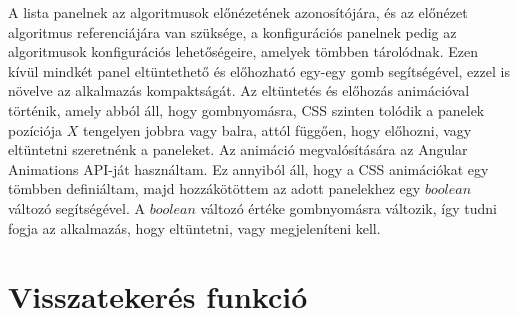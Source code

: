 A lista panelnek az algoritmusok előnézetének azonosítójára, és az előnézet algoritmus referenciájára van szüksége, a konfigurációs panelnek pedig az algoritmusok konfigurációs lehetőségeire, amelyek tömbben tárolódnak. Ezen kívül mindkét panel eltüntethető és előhozható egy-egy gomb segítségével, ezzel is növelve az alkalmazás kompaktságát. Az eltüntetés és előhozás animációval történik, amely abból áll, hogy gombnyomásra, CSS szinten tolódik a panelek pozíciója $X$ tengelyen jobbra vagy balra, attól függően, hogy előhozni, vagy eltüntetni szeretnénk a paneleket. Az animáció megvalósítására az Angular Animations API-ját használtam. Ez annyiból áll, hogy a CSS animációkat egy tömbben definiáltam, majd hozzákötöttem az adott panelekhez egy $boolean$ változó segítségével. A $boolean$ változó értéke gombnyomásra változik, így tudni fogja az alkalmazás, hogy eltüntetni, vagy megjeleníteni kell.


\section{Visszatekerés funkció}

